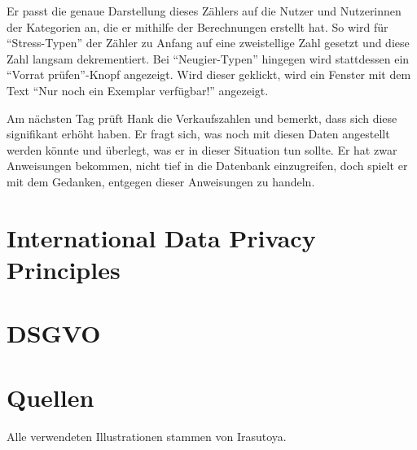 \documentclass[11pt, a4paper]{scrartcl}
\begin{document}
Er passt die genaue Darstellung dieses Zählers auf die Nutzer und Nutzerinnen der Kategorien an,
die er mithilfe der Berechnungen erstellt hat.
So wird für \enquote{Stress-Typen} der Zähler zu Anfang auf eine zweistellige Zahl gesetzt und diese Zahl langsam dekrementiert.
Bei \enquote{Neugier-Typen} hingegen wird stattdessen ein \enquote{Vorrat prüfen}-Knopf angezeigt.
Wird dieser geklickt, wird ein Fenster mit dem Text \enquote{Nur noch ein Exemplar verfügbar!} angezeigt.

Am nächsten Tag prüft Hank die Verkaufszahlen und bemerkt, dass sich diese signifikant erhöht haben.
Er fragt sich, was noch mit diesen Daten angestellt werden könnte und überlegt, was er in dieser Situation tun sollte.
Er hat zwar Anweisungen bekommen, nicht tief in die Datenbank einzugreifen,
doch spielt er mit dem Gedanken, entgegen dieser Anweisungen zu handeln.




\section{International Data Privacy Principles}

\section{DSGVO}

\newpage

\section{Quellen}

Alle verwendeten Illustrationen stammen von Irasutoya.\cite{mifune_irasutoya_nodate} 

\nocite{mifune_irasutoya_nodate}

\printbibliography[heading=none]
\end{document}
